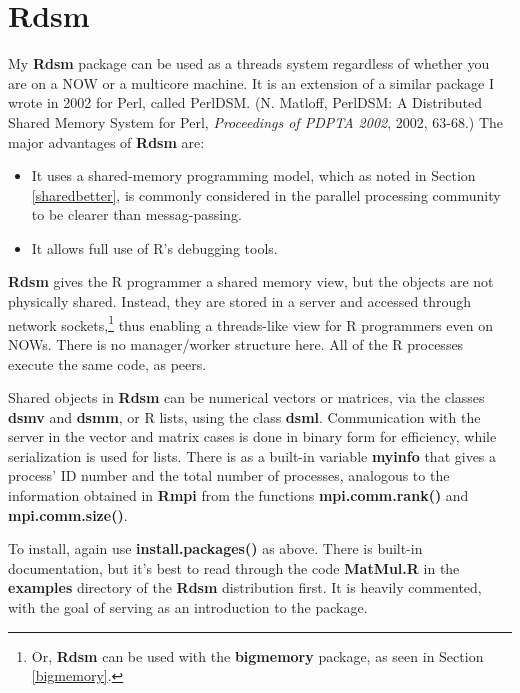 \section{Rdsm}

My {\bf Rdsm} package can be used as a threads system regardless of
whether you are on a NOW or a multicore machine.  It is an extension of
a similar package I wrote in 2002 for Perl, called PerlDSM.  (N.
Matloff, PerlDSM: A Distributed Shared Memory System for Perl, {\it
Proceedings of PDPTA 2002}, 2002, 63-68.)  The major advantages of {\bf
Rdsm} are:

\begin{itemize}

\item It uses a shared-memory programming model, which as noted in
Section \ref{sharedbetter}, is commonly considered in the parallel
processing community to be clearer than messag-passing.

\item It allows full use of R's debugging tools.

\end{itemize}

{\bf Rdsm} gives the R programmer a shared memory view, but the objects
are not physically shared.  Instead, they are stored in a server and
accessed through network sockets,\footnote{Or, {\bf Rdsm} can be used
with the {\bf bigmemory} package, as seen in Section \ref{bigmemory}.}
thus enabling a threads-like view for R programmers even on NOWs.  There
is no manager/worker structure here.  All of the R processes execute the
same code, as peers.

Shared objects in {\bf Rdsm} can be numerical vectors or matrices, via
the classes {\bf dsmv} and {\bf dsmm}, or R lists, using the class {\bf
dsml}.  Communication with the server in the vector and matrix cases is
done in binary form for efficiency, while serialization is used for
lists.  There is as a built-in variable {\bf myinfo} that gives a
process' ID number and the total number of processes, analogous to the
information obtained in {\bf Rmpi} from the functions {\bf
mpi.comm.rank()} and {\bf mpi.comm.size()}.

To install, again use {\bf install.packages()} as above.  There is
built-in documentation, but it's best to read through the code {\bf
MatMul.R} in the {\bf examples} directory of the {\bf Rdsm} distribution
first.  It is heavily commented, with the goal of serving as an
introduction to the package.

